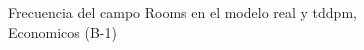 \begin{figure}[H]
    \centering
    
    \caption{Frecuencia del campo Rooms en el modelo real y tddpm, Economicos (B-1)}
    \label{frecuency-Rooms-tddpm_mlp}
\end{figure}